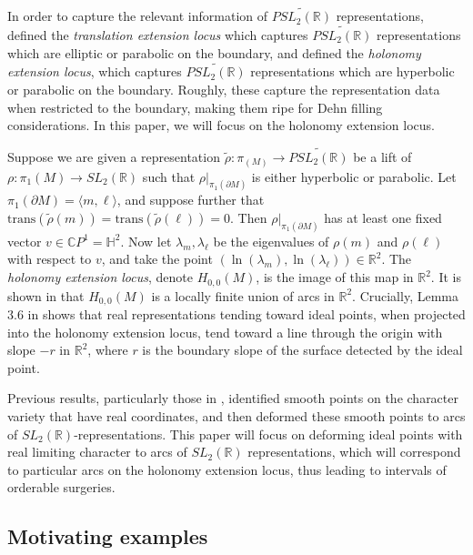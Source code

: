 \documentclass{article}
\theoremstyle{plain}
\theoremstyle{definition}
\theoremstyle{plain}
\theoremstyle{plain}
\theoremstyle{plain}
\theoremstyle{remark}
\theoremstyle{remark}
\theoremstyle{plain}
\theoremstyle{plain}
\begin{document}
In order to capture the relevant information of $\widetilde{PSL_2(\mathbb{R})}$ representations, \cite{cullerdunfield} defined the \emph{translation extension locus} which captures $\widetilde{PSL_2(\mathbb{R})}$ representations which are elliptic or parabolic on the boundary, and \cite{gao} defined the \emph{holonomy extension locus}, which captures $\widetilde{PSL_2(\mathbb{R})}$ representations which are hyperbolic or parabolic on the boundary. Roughly, these capture the representation data when restricted to the boundary, making them ripe for Dehn filling considerations. In this paper, we will focus on the holonomy extension locus. 

\medskip

Suppose we are given a representation $\widetilde{\rho}: \pi_(M) \to \widetilde{PSL_2(\mathbb{R})}$ be a lift of $\rho: \pi_1(M) \to SL_2(\mathbb{R})$ such that $\rho|_{\pi_1(\partial M)}$ is either hyperbolic or parabolic. Let $\pi_1(\partial M) = \langle m, \ell \rangle$, and suppose further that $\text{trans}(\widetilde{\rho}(m)) = \text{trans}(\widetilde{\rho}(\ell)) = 0$. Then $\rho|_{\pi_1(\partial M)}$ has at least one fixed vector $v \in \mathbb{C}P^1 = \mathbb{H}^2$. Now let $\lambda_m, \lambda_\ell$ be the eigenvalues of $\rho(m)$ and $\rho(\ell)$ with respect to $v$, and take the point $(\ln(\lambda_m), \ln(\lambda_\ell)) \in \mathbb{R}^2$. The \emph{holonomy extension locus}, denote $H_{0, 0}(M)$, is the image of this map in $\mathbb{R}^2$. It is shown in \cite{gao} that $H_{0, 0}(M)$ is a locally finite union of arcs in $\mathbb{R}^2$. Crucially, Lemma 3.6 in \cite{gao} shows that real representations tending toward ideal points, when projected into the holonomy extension locus, tend toward a line through the origin with slope $-r$ in $\mathbb{R}^2$, where $r$ is the boundary slope of the surface detected by the ideal point. 

\medskip

Previous results, particularly those in \cite{gao}, identified smooth points on the character variety that have real coordinates, and then deformed these smooth points to arcs of $SL_2(\mathbb{R})$-representations. This paper will focus on deforming ideal points with real limiting character to arcs of $SL_2(\mathbb{R})$ representations, which will correspond to particular arcs on the holonomy extension locus, thus leading to intervals of orderable surgeries.

\subsection{Motivating examples}
\end{document}
